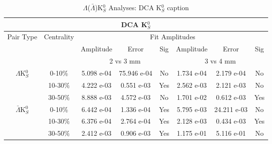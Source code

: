 \documentclass[../AnalysisNoteJBuxton.tex]{subfiles}
\begin{document}
\begin{table}
 \centering
 \begin{tabular}{|c|c|c|c|c||c|c|c|}
  \multicolumn{8}{c}{DCA K$^{0}_{S}$} \\
  \hline
  \multirow{3}{*}{Pair Type} & \multirow{3}{*}{Centrality} & \multicolumn{6}{c|}{Fit Amplitudes} \\
  \cline{3-8}
   & & Amplitude & Error & Sig & Amplitude & Error & Sig \\  
  \cline{3-8}
   & & \multicolumn{3}{c||}{2 vs 3 mm} & \multicolumn{3}{c|}{3 vs 4 mm} \\  
  \hline  
  \multirow{3}{*}{$\Lambda$K$^{0}_{S}$}  
   &  0-10\% & 5.098 e-04 & 75.946 e-04 & No & 1.734 e-04 & 2.179 e-04 & No \\
   & 10-30\% & 4.222 e-03 & 0.551 e-03 & Yes & 2.562 e-03 & 2.121 e-03 & No \\
   & 30-50\% & 8.888 e-03 & 4.572 e-03 & No & 1.701 e-02 & 0.612 e-03 & Yes \\
  \hline  
  \multirow{3}{*}{$\bar{\Lambda}$K$^{0}_{S}$}  
   &  0-10\% & 6.442 e-04 & 1.336 e-04 & Yes & 5.795 e-03 & 24.211 e-03 & No \\
   & 10-30\% & 6.376 e-04 & 2.764 e-04 & Yes & 2.128 e-03 & 0.434 e-03 & Yes \\
   & 30-50\% & 2.412 e-03 & 0.906 e-03 & Yes & 1.175 e-01 & 5.116 e-01 & No \\
  \hline
 \end{tabular}
 \caption{$\Lambda$($\bar{\Lambda}$)K$^{0}_{S}$ Analyses: DCA K$^{0}_{S}$ caption}
 \label{tab:K0DcaLamK0}
\end{table}
\end{document}
